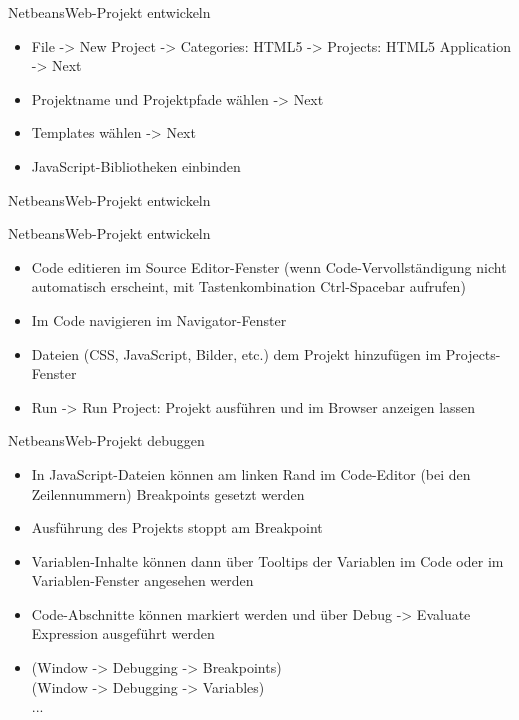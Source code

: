 \documentclass[xcolor=dvipsnames,pdftex]{beamer}
\begin{document}
\begin{frame}{Netbeans}{Web-Projekt entwickeln}
	\begin{itemize}
		\item File -> New Project -> Categories: HTML5 -> Projects: HTML5 Application -> Next\\
		\item Projektname und Projektpfade wählen -> Next\\
		\item Templates wählen -> Next\\
		\item JavaScript-Bibliotheken einbinden\\
	\end{itemize}
\end{frame}

\begin{frame}{Netbeans}{Web-Projekt entwickeln}
\end{frame}

\begin{frame}{Netbeans}{Web-Projekt entwickeln}
	\begin{itemize}
		\item Code editieren im Source Editor-Fenster
			(wenn Code-Vervollständigung nicht automatisch erscheint,
			mit Tastenkombination Ctrl-Spacebar aufrufen)
			\pause
		\item Im Code navigieren im Navigator-Fenster
			\pause
		\item Dateien (CSS, JavaScript, Bilder, etc.) dem Projekt hinzufügen im Projects-Fenster
			\pause
		\item Run -> Run Project: Projekt ausführen und im Browser anzeigen
			lassen
	\end{itemize}
\end{frame}



\begin{frame}{Netbeans}{Web-Projekt debuggen}
	\begin{itemize}
		\item In JavaScript-Dateien können am linken Rand im Code-Editor (bei den
			Zeilennummern) Breakpoints gesetzt werden\\
		\item Ausführung des Projekts stoppt am Breakpoint\\
		\item Variablen-Inhalte können dann über Tooltips der Variablen im Code oder
			im Variablen-Fenster angesehen werden\\
		\item Code-Abschnitte können markiert werden und über Debug -> Evaluate
			Expression ausgeführt werden\\
		\item (Window -> Debugging -> Breakpoints)\\
			(Window -> Debugging -> Variables)\\
			...
	\end{itemize}
\end{frame}
\end{document}

